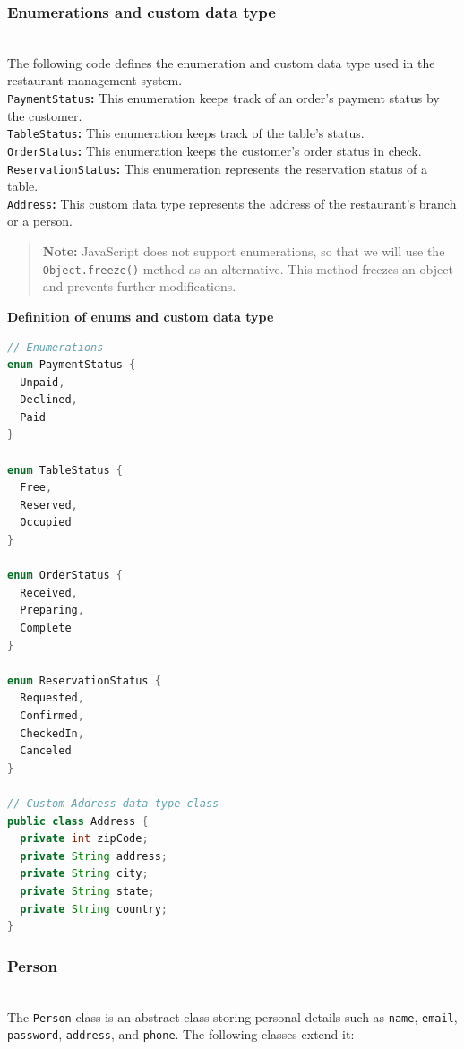 \subsubsection{Enumerations and custom data type}\label{7N-TAApAN8Vo6LANAlsO7}
\\
The following code defines the enumeration and custom data type used in the restaurant management system.
\\
\texttt{PaymentStatus}\textbf{:} This enumeration keeps track of an order's payment status by the customer.
\\
\texttt{TableStatus}\textbf{:} This enumeration keeps track of the table's status.
\\
\texttt{OrderStatus}\textbf{:} This enumeration keeps the customer's order status in check.
\\
\texttt{ReservationStatus}\textbf{:} This enumeration represents the reservation status of a table.
\\
\texttt{Address}\textbf{:} This custom data type represents the address of the restaurant's branch or a person.
\begin{quote}
\textbf{Note:} JavaScript does not support enumerations, so that we will use the \texttt{Object.freeze()} method as an alternative. This method freezes an object and prevents further modifications.
\end{quote}

\textbf{Definition of enums and custom data type}

\begin{lstlisting}[language=Java]
// Enumerations
enum PaymentStatus {
  Unpaid,
  Declined,
  Paid
}

enum TableStatus {
  Free,
  Reserved,
  Occupied
}

enum OrderStatus {
  Received,
  Preparing,
  Complete
}

enum ReservationStatus {
  Requested,
  Confirmed,
  CheckedIn,
  Canceled
}

// Custom Address data type class
public class Address {
  private int zipCode;
  private String address;
  private String city;
  private String state;
  private String country;
}
\end{lstlisting}

\subsubsection{Person}\label{hm9guZSO9sy4mJX_nFXza}
\\
The \texttt{Person} class is an abstract class storing personal details such as \texttt{name}, \texttt{email}, \texttt{password}, \texttt{address}, and \texttt{phone}. The following classes extend it:

